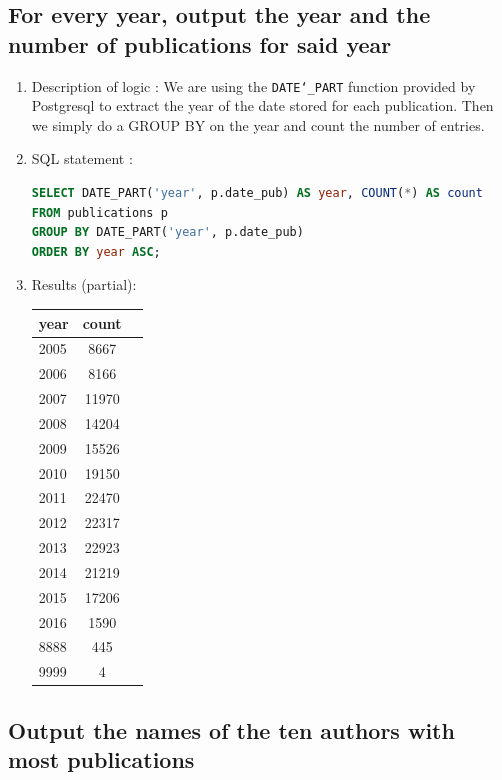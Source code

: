 \documentclass[doubleside, titlepage]{article}
\begin{document}
\subsection{For every year, output the year and the number of publications for said year}
	\begin{enumerate}
	\item Description of logic : We are using the \texttt{DATE\char`_PART} function provided by Postgresql to extract the year of the date stored for each publication. Then
      we simply do a GROUP BY on the year and count the number of entries.
	\item SQL statement :
		\begin{lstlisting}[language=SQL,showspaces=false,basicstyle=\ttfamily,numberstyle=\tiny,commentstyle=\color{gray}]
SELECT DATE_PART('year', p.date_pub) AS year, COUNT(*) AS count
FROM publications p
GROUP BY DATE_PART('year', p.date_pub)
ORDER BY year ASC;
		\end{lstlisting}

	\item Results (partial):\\

	\begin{tabular}{|l|c|r|}
  \hline
  year & count \\
  \hline
2005 & 	8667\\
2006 & 	8166\\
2007 & 	11970\\
2008 & 	14204\\
2009 & 	15526\\
2010 & 	19150\\
2011 & 	22470\\
2012 & 	22317\\
2013 & 	22923\\
2014 & 	21219\\
2015 & 	17206\\
2016 & 	1590\\
8888 & 	445\\
9999 & 	4\\
\hline
\end{tabular}

	\end{enumerate}


\subsection{Output the names of the ten authors with most publications}
\end{document}
